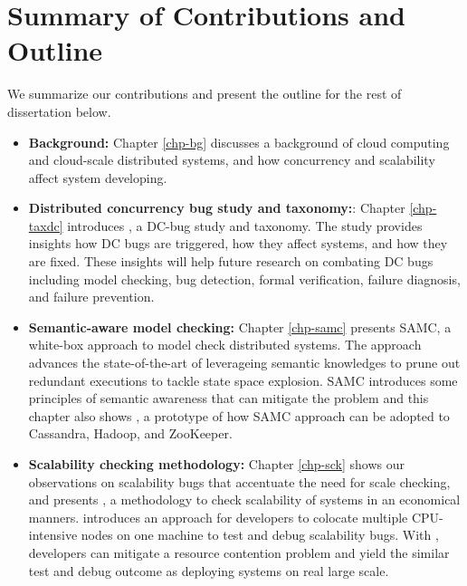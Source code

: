 \section{Summary of Contributions and Outline}

We summarize our contributions and present the outline for the rest of
dissertation below.

\begin{itemize}

\item \textbf{Background:} Chapter \ref{chp-bg} discusses a background of cloud
computing and cloud-scale distributed systems, and how concurrency and
scalability affect system developing.

\item \textbf{Distributed concurrency bug study and taxonomy:}: Chapter
\ref{chp-taxdc} introduces \taxdc, a DC-bug study and taxonomy. The study
provides insights how DC bugs are triggered, how they affect systems, and how
they are fixed. These insights will help future research on combating DC bugs
including model checking, bug detection, formal verification, failure diagnosis,
and failure prevention.

\item \textbf{Semantic-aware model checking:} Chapter \ref{chp-samc} presents
SAMC, a white-box approach to model check distributed systems. The approach
advances the state-of-the-art of leverageing semantic knowledges to prune out
redundant executions to tackle state space explosion. SAMC introduces some
principles of semantic awareness that can mitigate the problem and this chapter
also shows \sampro, a prototype of how SAMC approach can be adopted to
Cassandra, Hadoop, and ZooKeeper.


\item \textbf{Scalability checking methodology:} Chapter \ref{chp-sck} shows our
observations on scalability bugs that accentuate the need for scale checking,
and presents \sck, a methodology to check scalability of systems in an
economical manners. \sck introduces an approach for developers to colocate
multiple CPU-intensive nodes on one machine to test and debug scalability bugs.
With \sck, developers can mitigate a resource contention problem and yield the
similar test and debug outcome as deploying systems on real large scale.


\end{itemize}
